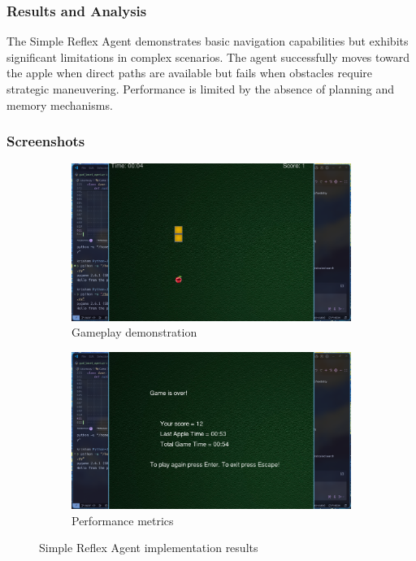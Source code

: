 \documentclass[11pt,a4paper]{article}
\begin{document}
\subsubsection{Results and Analysis}
The Simple Reflex Agent demonstrates basic navigation capabilities but exhibits significant limitations in complex scenarios. The agent successfully moves toward the apple when direct paths are available but fails when obstacles require strategic maneuvering. Performance is limited by the absence of planning and memory mechanisms.

\subsubsection{Screenshots}
\begin{figure}[H]
    \centering
    \begin{subfigure}{0.6\textwidth}
        \includegraphics[width=\textwidth]{ss/simple_play.png}
        \caption{Gameplay demonstration}
    \end{subfigure}
    \hfill
    \begin{subfigure}{0.6\textwidth}
        \includegraphics[width=\textwidth]{ss/simple_score.png}
        \caption{Performance metrics}
    \end{subfigure}
    \caption{Simple Reflex Agent implementation results}
\end{figure}
\end{document}
